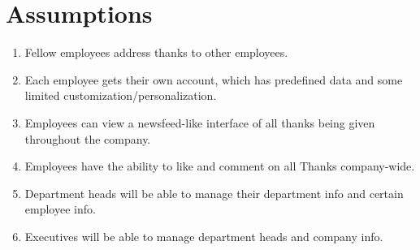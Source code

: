 \documentclass[11pt]{report}
\begin{document}
\section{Assumptions}
\begin{enumerate}
\item Fellow employees address thanks to other employees.
\item Each employee gets their own account, which has predefined data and some limited customization/personalization.
\item Employees can view a newsfeed-like interface of all thanks being given throughout the company.
\item Employees have the ability to like and comment on all Thanks company-wide.
\item Department heads will be able to manage their department info and certain employee info.
\item Executives will be able to manage department heads and company info.
\end{enumerate}
\clearpage
\end{document}
